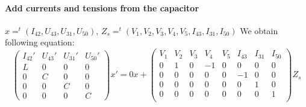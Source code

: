 \documentclass[10pt]{article}
\begin{document}
\paragraph{Add currents and tensions from the capacitor}
$x=^{t}(I_{42},U_{43},U_{31},U_{50})$,
$Z_{s}=^{t}(V_{1},V_{2},V_{3},V_{4},V_{5},I_{43},I_{31},I_{50})$
We obtain following equation:
\[\left(\begin{array}{cccc}
  I_{42}'&U_{43}'&U_{31}'&U_{50}'\\
  \hline
L&0&0&0\\
0&C&0&0\\
0&0&C&0\\
0&0&0&C
\end{array}\right)x'=
0x+
\left(\begin{array}{cccccccc}
  V_{1}&V_{2}&V_{3}&V_{4}&V_{5}&I_{43}&I_{31}&I_{50}\\
  \hline
  0&1&0&-1&0&0&0&0\\
  0&0&0&0&0&-1&0&0\\
  0&0&0&0&0&0&1&0\\
  0&0&0&0&0&0&0&1\\
\end{array}\right)Z_{s}
\]
\end{document}
